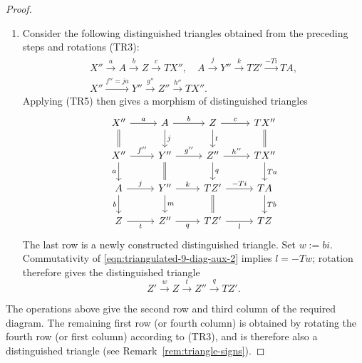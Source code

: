 \begin{proof}
\begin{enumerate}
		\item Consider the following distinguished triangles obtained from
		the preceding steps and rotations (TR3):
		\begin{gather*}
			X'' \xrightarrow{a} A \xrightarrow{b} Z \xrightarrow{c} TX'', \quad A \xrightarrow{j} Y'' \xrightarrow{k} TZ' \xrightarrow{-Ti} TA, \\
			X'' \xrightarrow{f'' = ja} Y'' \xrightarrow{g''} Z'' \xrightarrow{h''} TX'' .
		\end{gather*}
		Applying (TR5) then gives a morphism of distinguished triangles
		\begin{equation}\label{eqn:triangulated-9-diag-aux-2}\begin{tikzcd}
			X'' \arrow[r, "a"] \arrow[equal, d] & A \arrow[r, "b"] \arrow[d, "j"] & Z \arrow[r, "c"] \arrow[d, "t"] & TX'' \arrow[equal, d] \\
			X'' \arrow[r, "{f''}"] \arrow[d, "a"'] & Y'' \arrow[r, "{g''}"] \arrow[equal, d] & Z'' \arrow[r, "{h''}"] \arrow[d, "q"] & TX'' \arrow[d, "Ta"] \\
			A \arrow[r, "j"] \arrow[d, "b"'] & Y'' \arrow[r, "k"] \arrow[d, "m"] & TZ' \arrow[r, "{-Ti}"] \arrow[equal, d] & TA \arrow[d, "Tb"] \\
			Z \arrow[r, "t"'] & Z'' \arrow[r, "q"'] & TZ' \arrow[r, "l"'] & TZ
		\end{tikzcd}\end{equation}
		The last row is a newly constructed distinguished triangle. Set
		$w := bi$. Commutativity of
		\eqref{eqn:triangulated-9-diag-aux-2} implies $l = -Tw$; rotation
		therefore gives the distinguished triangle
		\[ Z' \xrightarrow{w} Z \xrightarrow{t} Z'' \xrightarrow{q} TZ' . \]
	\end{enumerate}

	The operations above give the second row and third column of the required
	diagram. The remaining first row (or fourth column) is obtained by
	rotating the fourth row (or first column) according to (TR3), and is
	therefore also a distinguished triangle (see
	Remark~\ref{rem:triangle-signs}).


\end{proof}
